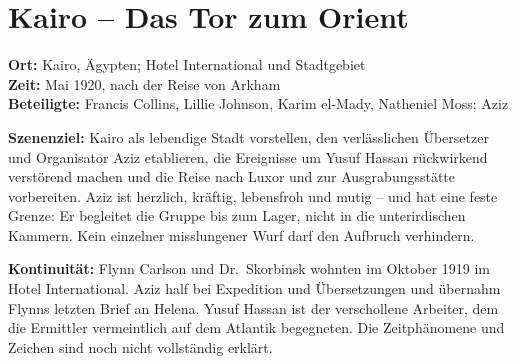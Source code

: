 \chapter{Kairo -- Das Tor zum Orient}
\noindent\textbf{Ort:} Kairo, Ägypten; Hotel International und Stadtgebiet\\
\textbf{Zeit:} Mai 1920, nach der Reise von Arkham\\
\textbf{Beteiligte:} Francis Collins, Lillie Johnson, Karim el-Mady, Natheniel Moss; Aziz

\begin{meisterinfo}
\textbf{Szenenziel:} Kairo als lebendige Stadt vorstellen, den verlässlichen Übersetzer und Organisator Aziz etablieren, die Ereignisse um Yusuf Hassan rückwirkend verstörend machen und die Reise nach Luxor und zur Ausgrabungsstätte vorbereiten. Aziz ist herzlich, kräftig, lebensfroh und mutig -- und hat eine feste Grenze: Er begleitet die Gruppe bis zum Lager, nicht in die unterirdischen Kammern. Kein einzelner misslungener Wurf darf den Aufbruch verhindern.

\textbf{Kontinuität:} Flynn Carlson und Dr.~Skorbinsk wohnten im Oktober 1919 im Hotel International. Aziz half bei Expedition und Übersetzungen und übernahm Flynns letzten Brief an Helena. Yusuf Hassan ist der verschollene Arbeiter, dem die Ermittler vermeintlich auf dem Atlantik begegneten. Die Zeitphänomene und Zeichen sind noch nicht vollständig erklärt.
\end{meisterinfo}

